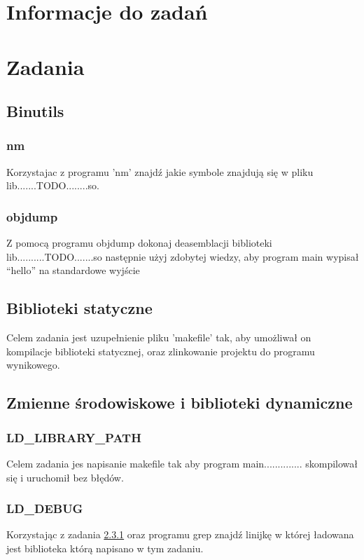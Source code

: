 \documentclass[12pt]{article}
\begin{document}

\tableofcontents
\pagebreak



\section{Informacje do zadań}

\section{Zadania}
\subsection{Binutils}
\subsubsection{nm}
Korzystajac z programu 'nm' znajdź jakie symbole znajdują się w pliku
lib.......TODO........so.
\subsubsection{objdump}
Z pomocą programu objdump dokonaj deasemblacji biblioteki
lib..........TODO.......so następnie użyj zdobytej wiedzy, aby program main
wypisał ``hello'' na standardowe wyjście
\subsection{Biblioteki statyczne}
Celem zadania jest uzupełnienie pliku 'makefile' tak, aby umożliwał on
kompilacje biblioteki statycznej, oraz zlinkowanie projektu do programu
wynikowego.
\subsection{Zmienne środowiskowe i biblioteki dynamiczne}
\subsubsection{LD\_LIBRARY\_PATH}\label{ex1}
Celem zadania jes napisanie makefile tak aby program main..............
skompilował się i uruchomił bez błędów.
\subsubsection{LD\_DEBUG}
Korzystając z zadania \ref{ex1} oraz programu grep znajdź linijkę w której
ładowana jest biblioteka którą napisano w tym zadaniu.
\end{document}
